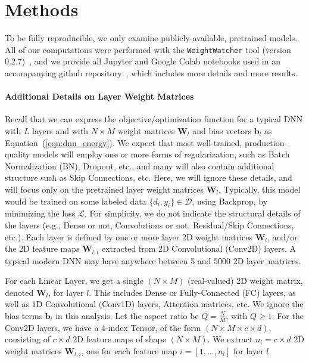 \section{Methods}
\label{sxn:methods}


To be fully reproducible, we only examine publicly-available, pretrained models.
All of our computations were performed with the \texttt{WeightWatcher} tool (version 0.2.7)~\cite{weightwatcher_package}, and we provide all Jupyter and Google Colab notebooks used in an accompanying github repository~\cite{kdd20_sub_repo}, which includes more details and more results.


\paragraph{Additional Details on Layer Weight Matrices}

Recall that we can express the objective/optimization function for a typical DNN with $L$ layers and with $N\times M$ weight matrices $\mathbf{W}_{l}$ and bias vectors $\mathbf{b}_{l}$ as Equation~(\ref{eqn:dnn_energy}).
We expect that most well-trained, production-quality models will employ one or more forms of regularization, such as Batch Normalization (BN), Dropout, etc., and many will also contain additional structure such as Skip Connections, etc. 
Here, we will ignore these details, and will focus only on the pretrained layer weight matrices $\mathbf{W}_{l}$.
Typically, this model would be trained on some labeled data $\{d_{i},y_{i}\}\in\mathcal{D}$, using Backprop, by minimizing the loss $\mathcal{L}$.
For simplicity, we do not indicate the structural details of the layers (e.g., Dense or not, Convolutions or not, Residual/Skip Connections, etc.). 
Each layer is defined by one or more layer 2D weight matrices $\mathbf{W}_{l}$, and/or the 2D feature maps $\mathbf{W}_{l,i}$ extracted from 2D Convolutional (Conv2D) layers.
A typical modern DNN may have anywhere between 5 and 5000 2D layer~matrices.

For each Linear Layer, we get a  single $(N\times M)$ (real-valued) 2D weight matrix, denoted $\mathbf{W}_{l}$, for layer $l$.  
This includes Dense or Fully-Connected (FC) layers, as well as 1D Convolutional (Conv1D) layers, Attention matrices, etc.
We ignore the bias terms $\mathbf{b}_{l}$ in this analysis. 
Let the aspect ratio be $Q=\frac{N}{M}$, with $Q\ge 1$.
For the Conv2D layers, we have a 4-index Tensor, of the form $(N\times M \times c\times d)$, consisting
of $c\times d$ 2D feature maps of shape $(N\times M)$.    
We  extract $n_{l}=c\times d$ 2D weight matrices $\mathbf{W}_{l,i}$, one for each feature map $i=[1,\dots,n_{l}]$ for layer $l$.


